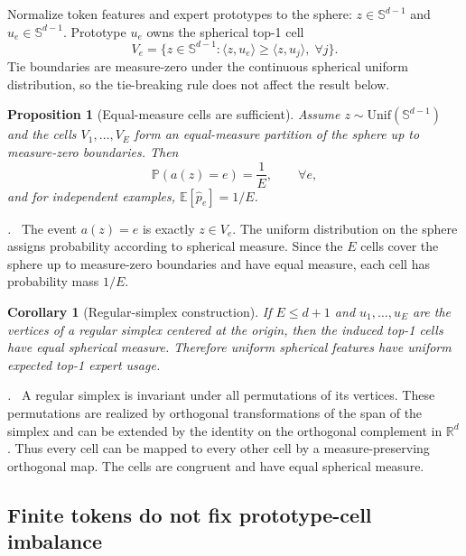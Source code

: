 \documentclass{article}
\newtheorem{proposition}{Proposition}
\newtheorem{corollary}{Corollary}
\renewenvironment{proof}[1][\proofname]{\par\noindent\textit{#1.}\ }{\hfill\qedsymbol\par}
\begin{document}
Normalize token features and expert prototypes to the sphere:
$z\in\mathbb{S}^{d-1}$ and $u_e\in\mathbb{S}^{d-1}$.  Prototype $u_e$ owns the
spherical top-1 cell
\begin{equation}
 V_e=\{z\in\mathbb{S}^{d-1}:\langle z,u_e\rangle\ge
 \langle z,u_j\rangle,\;\forall j\}.
\end{equation}
Tie boundaries are measure-zero under the continuous spherical uniform
distribution, so the tie-breaking rule does not affect the result below.

\begin{proposition}[Equal-measure cells are sufficient]
\label{prop:equal_measure_cells}
Assume $z\sim\mathrm{Unif}(\mathbb{S}^{d-1})$ and the cells
$V_1,\ldots,V_E$ form an equal-measure partition of the sphere up to
measure-zero boundaries.  Then
\begin{equation}
 \mathbb{P}(a(z)=e)=\frac{1}{E},\qquad \forall e,
\end{equation}
and for independent examples, $\mathbb{E}[\widehat p_e]=1/E$.
\end{proposition}

\begin{proof}
The event $a(z)=e$ is exactly $z\in V_e$.  The uniform distribution on the sphere
assigns probability according to spherical measure.  Since the $E$ cells cover
the sphere up to measure-zero boundaries and have equal measure, each cell has
probability mass $1/E$.
\end{proof}

\begin{corollary}[Regular-simplex construction]
If $E\le d+1$ and $u_1,\ldots,u_E$ are the vertices of a regular simplex centered
at the origin, then the induced top-1 cells have equal spherical measure.
Therefore uniform spherical features have uniform expected top-1 expert usage.
\end{corollary}

\begin{proof}
A regular simplex is invariant under all permutations of its vertices.  These
permutations are realized by orthogonal transformations of the span of the
simplex and can be extended by the identity on the orthogonal complement in
$\mathbb{R}^d$.  Thus every cell can be mapped to every other cell by a
measure-preserving orthogonal map.  The cells are congruent and have equal
spherical measure.
\end{proof}

\subsection{Finite tokens do not fix prototype-cell imbalance}
\end{document}
